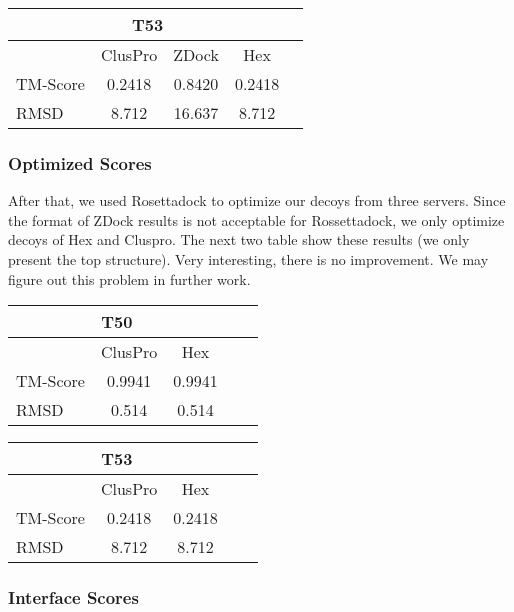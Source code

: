 \documentclass{article}
\begin{document}
\begin{center}
\begin{tabular}{|l|c|c|c|r|}
\multicolumn{4}{c}{T53} \\
    \hline
      & ClusPro & ZDock & Hex \\ \hline
    TM-Score & 0.2418 & 0.8420 & 0.2418 \\ \hline
    RMSD & 8.712 & 16.637 & 8.712 \\
    \hline
    \end{tabular}
\end{center}


\subsubsection*{Optimized Scores}

After that, we used Rosettadock to optimize our decoys from three servers. Since the format of ZDock results is not acceptable for Rossettadock, we only optimize decoys of Hex and Cluspro. The next two table show these results (we only present the top structure). Very interesting, there is no improvement. We may figure out this problem in further work.

\begin{center}
\begin{tabular}{|l|c|c|c|r|}
\multicolumn{3}{c}{T50} \\
    \hline
      & ClusPro & Hex \\ \hline
    TM-Score & 0.9941 & 0.9941 \\ \hline
    RMSD & 0.514 & 0.514 \\
    \hline
    \end{tabular}
\end{center}

\begin{center}
\begin{tabular}{|l|c|c|c|r|}
\multicolumn{3}{c}{T53} \\
    \hline
      & ClusPro & Hex \\ \hline
    TM-Score & 0.2418 & 0.2418 \\ \hline
    RMSD & 8.712 & 8.712 \\
    \hline
    \end{tabular}
\end{center}


\subsubsection*{Interface Scores}
\end{document}
